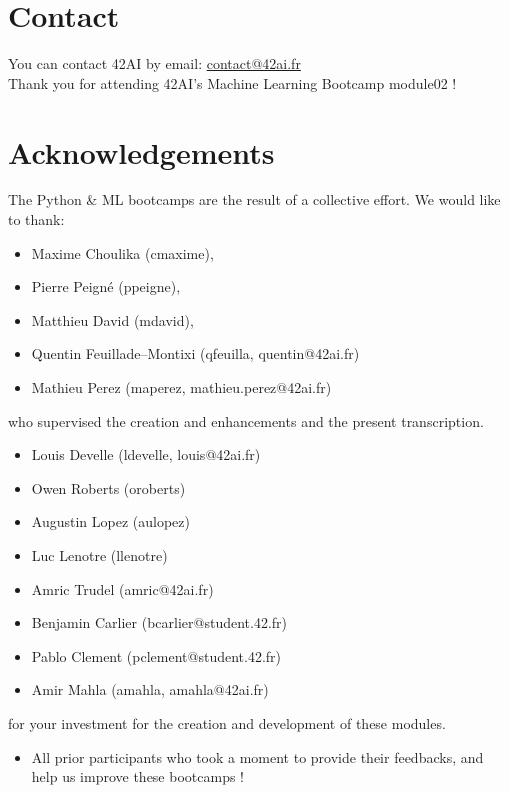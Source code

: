 \section*{Contact}
You can contact 42AI by email: \href{mailto:contact@42ai.fr}{contact@42ai.fr}\\
\newline
Thank you for attending 42AI's Machine Learning Bootcamp module02 !

\section*{Acknowledgements}
The Python \& ML bootcamps are the result of a collective effort. We would like to thank:
\begin{itemize}
  \item Maxime Choulika (cmaxime),
  \item Pierre Peigné (ppeigne),
  \item Matthieu David (mdavid),
  \item Quentin Feuillade--Montixi (qfeuilla, quentin@42ai.fr)
  \item Mathieu Perez (maperez, mathieu.perez@42ai.fr)
\end{itemize}
who supervised the creation and enhancements and the present transcription.

\begin{itemize}
  \item Louis Develle (ldevelle, louis@42ai.fr)
  \item Owen Roberts (oroberts)
  \item Augustin Lopez (aulopez)
  \item Luc Lenotre (llenotre)
  \item Amric Trudel (amric@42ai.fr)
  \item Benjamin Carlier (bcarlier@student.42.fr)
  \item Pablo Clement (pclement@student.42.fr)
  \item Amir Mahla (amahla, amahla@42ai.fr)
\end{itemize}
for your investment for the creation and development of these modules.

\begin{itemize}
    \item All prior participants who took a moment to provide their feedbacks, and help us improve these bootcamps !
  \end{itemize}

\vfill
\doclicenseThis
